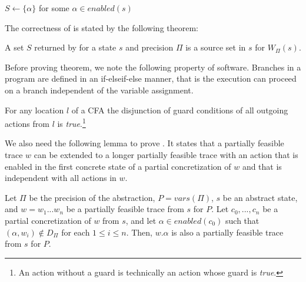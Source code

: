 \documentclass[numbook]{svjour3}
\begin{document}
\begin{algorithm}[t]
	\caption{Calculating a Source Set from $s$ with $\Pi$}
	\label{alg:por-calculate-source-set}
	\DontPrintSemicolon
	
	$S \gets \{\alpha\}$ for some $\alpha \in \mathit{enabled}(s)$\;
\end{algorithm}

The correctness of  is stated by the following theorem:

\begin{theorem}
    \label{theorem:alg-correctness}
	A set $S$ returned by  for a state $s$ and precision $\Pi$ is a source set in $s$ for $W_\Pi(s)$.
\end{theorem}

Before proving theorem, we note the following property of software. Branches in a program are defined in an if-elseif-else manner, that is the execution can proceed on a branch independent of the variable assignment.

\begin{property}
	\label{property:por-branch-guards-disjunction}
	For any location $l$ of a CFA the disjunction of guard conditions of all outgoing actions from $l$ is \emph{true}.\footnote{An action without a guard is technically an action whose guard is \emph{true}.}
\end{property}

We also need the following lemma to prove . It states that a partially feasible trace $w$ can be extended to a longer partially feasible trace with an action that is enabled in the first concrete state of a partial concretization of $w$ and that is independent with all actions in $w$.

\begin{lemma}
	\label{lemma:por-independence-non-disabling}
	Let $\Pi$ be the precision of the abstraction, $P = \mathit{vars}(\Pi)$, $s$ be an abstract state, and $w = w_1...w_n$ be a partially feasible trace from $s$ for $P$. Let $c_0,...,c_n$ be a partial concretization of $w$ from $s$, and let $\alpha \in {enabled}(c_0)$ such that $(\alpha, w_i) \notin D_\Pi$ for each $1 \le i \le n$. Then, $w.\alpha$ is also a partially feasible trace from $s$ for $P$.
\end{lemma}
\end{document}
